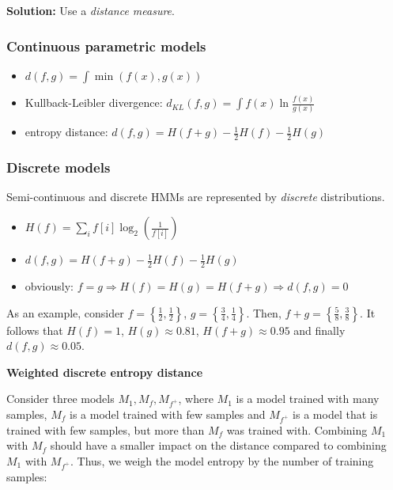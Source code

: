 \documentclass[11pt]{article}
\begin{document}
\vspace{5pt}

\textbf{Solution:} Use a \textit{distance measure}.
\vspace{10pt}

\subsubsection{Continuous parametric models}
\begin{itemize}
    \item $d(f, g) = \int \min(f(x), g(x))$
    \item Kullback-Leibler divergence: $d_{KL}(f, g) = \int f(x) \ln \frac{f(x)}{g(x)}$
    \item entropy distance: $d(f, g) = H(f + g) - \frac{1}{2} H(f) - \frac{1}{2} H(g)$
\end{itemize}

\subsubsection{Discrete models}
Semi-continuous and discrete HMMs are represented by \textit{discrete} distributions.
\begin{itemize}
    \item $H(f) = \sum\limits_i f[i] \log_2(\frac{1}{f[i]})$
    \item $d(f, g) = H(f + g) - \frac{1}{2} H(f) - \frac{1}{2} H(g)$
    \item obviously: $f = g \Rightarrow H(f) = H(g) = H(f + g) \Rightarrow d(f, g) = 0$
\end{itemize}

As an example, consider $f = \left\{\frac{1}{2}, \frac{1}{2} \right\}$, $g = \left\{\frac{3}{4}, \frac{1}{4} \right\}$. Then, $f + g = \left\{\frac{5}{8}, \frac{3}{8} \right\}$. It follows that $H(f) = 1$, $H(g) \approx 0.81$, $H(f + g) \approx 0.95$ and finally $d(f, g) \approx 0.05$.

\vspace{10pt}

\textbf{Weighted discrete entropy distance}

\vspace{5pt}

Consider three models $M_1, M_f, M_{f^+}$, where $M_1$ is a model trained with many samples, $M_f$ is a model trained with few samples and $M_{f^+}$ is a model that is trained with few samples, but more than $M_f$ was trained with. Combining $M_1$ with $M_f$ should have a smaller impact on the distance compared to combining $M_1$ with $M_{f^+}$. Thus, we weigh the model entropy by the number of training samples:
\end{document}
